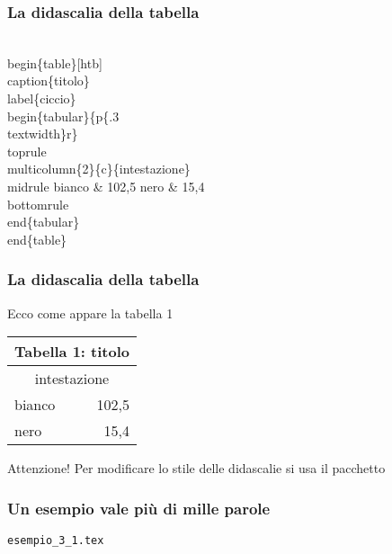 \documentclass[svgnames,%
	ucs,%
	pdftex]{guitbeamer}
\begin{document}
\begin{frame}
  \frametitle{La didascalia della tabella}
	\begin{LaTeXcode}
		\\begin\{table\}[htb]\alert{\\caption\{titolo\}\\label\{ciccio\}}\n
		\\begin\{tabular\}\{p\{.3\\textwidth\}r\}\
		\\toprule \n
		\\multicolumn\{2\}\{c\}\{intestazione\}\bs\bs \
		\\midrule \n
		\hspace*{5ex}bianco \& 102,5 \bs\bs\n
		\hspace*{5ex}nero   \& 15,4 \bs\bs\
		\\bottomrule\n
		\\end\{tabular\}\n
		\\end\{table\}
	\end{LaTeXcode}
\end{frame}
\begin{frame}
  \frametitle{La didascalia della tabella}
	Ecco come appare la tabella 1
	\begin{LaTeXoutput}
	  \begin{center}
		\begin{table}
		\begin{tabular}{p{}r}
		\multicolumn{2}{c}{Tabella 1: titolo}\\[1ex]\toprule %
		\multicolumn{2}{c}{intestazione}\\\midrule
		bianco & 102,5 \\
		nero   & 15,4 \\\bottomrule
		\end{tabular}
		\end{table}
	  \end{center}
	\end{LaTeXoutput}
  \bigskip
	\begin{block}{Attenzione!}
		Per modificare lo stile delle didascalie si usa il pacchetto 
	\end{block}
\end{frame}
\begin{frame}
  \frametitle{Un esempio vale pi\`u di mille parole}
	\begin{center}
		\alert{\texttt{esempio\_3\_1.tex}}
	\end{center}
\end{frame}
\end{document}
